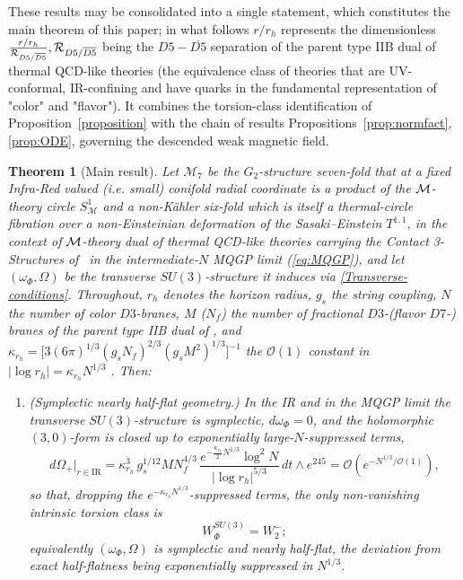 \documentclass[a4paper,11pt,fleqn]{article}
\theoremstyle{plain}
\newtheorem{theorem}{Theorem}[section]
\theoremstyle{definition}
\newcommand{\rh}{r_h}
\begin{document}
These results may be consolidated into a single statement, which constitutes the main
theorem of this paper; in what follows $r/r_h$ represents the dimensionless $\frac{r/r_h}{{\cal R}_{D5/\overline{D5}}}, {\cal R}_{D5/\overline{D5}}$ being the $D5-\overline{D5}$ separation of the parent type IIB dual \cite{metrics} of thermal QCD-like theories (the equivalence class of theories that are UV-conformal, IR-confining and have quarks in the fundamental representation of "color" and "flavor"). It combines the torsion-class identification of
Proposition~\ref{proposition} with the chain of results
Propositions~\ref{prop:normfact}, \ref{prop:ODE}, governing the
descended weak magnetic field.

\begin{theorem}[Main result]
\label{thm:mainresult}
Let $\mathcal{M}_7$ be the $G_2$-structure seven-fold that at a fixed Infra-Red valued (i.e. small) conifold radial coordinate is a product of the ${\cal M}$-theory circle $S^1_{\mathcal{M}}$ and a non-K\"{a}hler six-fold which is itself a thermal-circle fibration over a non-Einsteinian deformation of the Sasaki--Einstein $T^{1,1}$, in the context of ${\cal M}$-theory dual of thermal QCD-like theories carrying the Contact 3-Structures of~\cite{ACMS} in the intermediate-$N$ MQGP limit (\ref{eq:MQGP}), and let $(\omega_\Phi,\Omega)$ be the transverse $SU(3)$-structure it induces via
\eqref{Transverse-conditions}. Throughout, $\rh$ denotes the
horizon radius, $g_s$ the  string coupling, $N$ the number of color $D3$-branes, $M$ ($N_f$) the number of fractional $D3$-(flavor $D7$-) branes of the parent type IIB dual of \cite{Mia:2009wj}, and $\kappa_{r_h}=\bigl[3(6\pi)^{1/3}(g_sN_f)^{2/3}(g_sM^2)^{1/3}\bigr]^{-1}$
the $\mathcal{O}(1)$ constant in $|\log\rh|=\kappa_{r_h}N^{1/3}$ \cite{IITR-McGill-bulk-viscosity}. Then:
\begin{enumerate}
\item[\textup{(i)}] \emph{(Symplectic nearly half-flat geometry.)} In the IR and in the MQGP
limit the transverse $SU(3)$-structure is symplectic, $d\omega_\Phi = 0$, and the holomorphic
$(3,0)$-form is closed up to exponentially large-$N$-suppressed terms,
\begin{equation}
d\Omega_+\Big|_{r\in\mathrm{IR}}
= \kappa_{r_h}^{3}\,g_s^{1/12} M N_f^{4/3}\,
\frac{e^{-\frac{\kappa_{r_h}}{2}N^{1/3}}\log^2 N}{|\log\rh|^{5/3}}\,
dt\wedge e^{245}
= \mathcal{O}\!\left(e^{-N^{1/3}/\mathcal{O}(1)}\right),
\label{eq:thm-dOmega}
\end{equation}
so that, dropping the $e^{-\kappa_{r_h}N^{1/3}}$-suppressed terms, the only non-vanishing
intrinsic torsion class is
\begin{equation}
W_\Phi^{SU(3)} = W_2^-;
\label{eq:thm-Ws}
\end{equation}
equivalently $(\omega_\Phi,\Omega)$ is symplectic and nearly half-flat, the deviation from
exact half-flatness being exponentially suppressed in $N^{1/3}$.


\end{enumerate}
\end{theorem}
\end{document}

